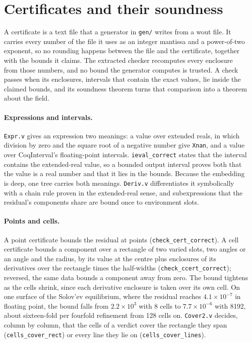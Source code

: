 \documentclass[11pt]{article}
\newcommand{\code}[1]{\texttt{#1}}
\begin{document}
\section{Certificates and their soundness}\label{sec:certs}

A certificate is a text file that a generator in \code{gen/} writes from a wout
file. It carries every number of the file it uses as an integer mantissa and a
power-of-two exponent, so no rounding happens between the file and the
certificate, together with the bounds it claims. The extracted checker
recomputes every enclosure from those numbers, and no bound the generator
computes is trusted. A check passes when its enclosures, intervals that contain
the exact values, lie inside the claimed bounds, and its soundness theorem turns
that comparison into a theorem about the field.

\paragraph{Expressions and intervals.}
\code{Expr.v} gives an expression two meanings: a value over extended reals, in
which division by zero and the square root of a negative number give
\code{Xnan}, and a value over CoqInterval's floating-point intervals.
\code{ieval\_correct} states that the interval contains the extended-real value,
so a bounded output interval proves both that the value is a real number and
that it lies in the bounds. Because the embedding is deep, one tree carries both
meanings. \code{Deriv.v} differentiates it symbolically with a chain rule proven
in the extended-real sense, and subexpressions that the residual's components
share are bound once to environment slots.

\paragraph{Points and cells.}
A point certificate bounds the residual at points (\code{check\_cert\_correct}).
A cell certificate bounds a component over a rectangle of two varied slots, two
angles or an angle and the radius, by its value at the centre plus enclosures of
its derivatives over the rectangle times the half-widths
(\code{check\_ccert\_correct}); reversed, the same data bounds a component away
from zero. The bound tightens as the cells shrink, since each derivative
enclosure is taken over its own cell. On one surface of the Solov'ev
equilibrium, where the residual reaches $4.1\times10^{-7}$ in floating point,
the bound falls from $2.2\times10^3$ with 8 cells to $7.7\times10^{-6}$ with
8192, about sixteen-fold per fourfold refinement from 128 cells on.
\code{Cover2.v} decides, column by column, that the cells of a verdict cover the
rectangle they span (\code{cells\_cover\_rect}) or every line they lie on
(\code{cells\_cover\_lines}).
\end{document}
